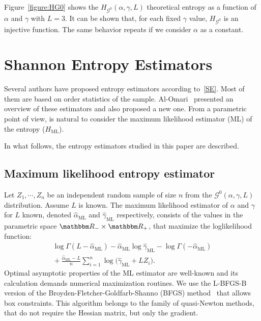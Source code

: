 \documentclass[journal]{IEEEtran}
\begin{document}

	Figure~\ref{figure:HG0} shows the $H_{\mathcal G^0}(\alpha,\gamma,L)$ theoretical entropy as a function of $\alpha$ and $\gamma$ with $L=3$. 
	It can be shown that, for each fixed $\gamma$ value, $H_{\mathcal G^0}$ is an injective function. The same behavior repeats if we consider $\alpha$ as a constant.
	
	\section{Shannon Entropy Estimators}
	
	Several authors have proposed entropy estimators according to~\eqref{SE}.
	Most of them are based on order statistics of the sample. 
	Al-Omari~\cite{AlOmari2016} presented an overview of these estimators and also proposed a new one. 
	From a parametric point of view, is natural to consider the maximum likelihood estimator (ML) of the entropy ($H_{\text{ML}}$).
	
	In what follows, the entropy estimators studied in this paper are described.
	
	\subsection{Maximum likelihood entropy estimator}
	
	Let $Z_1,\cdots, Z_n$ be an independent random sample of size $n$ from the $\mathcal G^0(\alpha,\gamma,L)$ distribution.
	Assume $L$ is known.
	The maximum likelihood estimator of $\alpha$ and $\gamma$ for $L$ known, denoted $\widehat\alpha_{\text{ML}}$ and $\widehat\gamma_{\text{ML}}$ respectively, consists of the values in the parametric space $\mathbbm R_-\times\mathbbm R_+$, that maximize the loglikelihood function:
	\begin{align}
		\log \Gamma(L-\widehat\alpha_{\text{ML}})-
		\widehat\alpha_{\text{ML}}\log \widehat\gamma_{\text{ML}} -\log\Gamma(-\widehat\alpha_{\text{ML}}) \nonumber \\
		\mbox{}+\frac{\widehat\alpha_{\text{ML}}-L}{n} \sum_{i=1}^n\log\big(\widehat\gamma_{\text{ML}}+L Z_i\big).
		\label{ML}
	\end{align}
	Optimal asymptotic properties of the ML estimator are well-known and its calculation demands numerical maximization routines.
	We use the L-BFGS-B version of the Broyden-Fletcher-Goldfarb-Shanno (BFGS) method~\cite{Luenberger2008} that allows box constraints.
	This algorithm belongs to the family of quasi-Newton methods, that do not require the Hessian matrix, but only the gradient.
	
\end{document}
